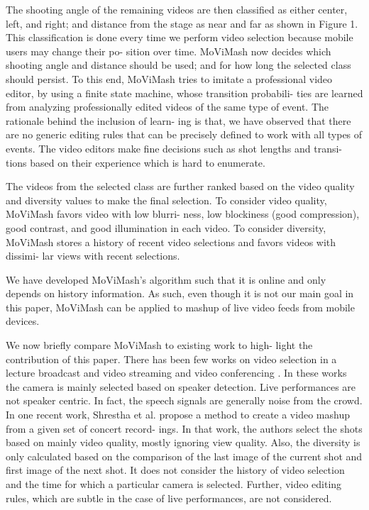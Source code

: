 \documentclass{new}
\begin{document}
The shooting angle of the remaining videos are then classified as
either center, left, and right; and distance from the stage as near and
far as shown in Figure 1. This classification is done every time we
perform video selection because mobile users may change their po-
sition over time. MoViMash now decides which shooting angle and
distance should be used; and for how long the selected class should
persist. To this end, MoViMash tries to imitate a professional video
editor, by using a finite state machine, whose transition probabili-
ties are learned from analyzing professionally edited videos of the
same type of event. The rationale behind the inclusion of learn-
ing is that, we have observed that there are no generic editing rules
that can be precisely defined to work with all types of events. The
video editors make fine decisions such as shot lengths and transi-
tions based on their experience which is hard to enumerate.

The videos from the selected class are further ranked based on
the video quality and diversity values to make the final selection.
To consider video quality, MoViMash favors video with low blurri-
ness, low blockiness (good compression), good contrast, and good
illumination in each video. To consider diversity, MoViMash stores
a history of recent video selections and favors videos with dissimi-
lar views with recent selections.

We have developed MoViMash’s algorithm such that it is online
and only depends on history information. As such, even though
it is not our main goal in this paper, MoViMash can be applied to
mashup of live video feeds from mobile devices.

We now briefly compare MoViMash to existing work to high-
light the contribution of this paper. There has been few works on
video selection in a lecture broadcast and video streaming \cite{21} \cite{6}
and video conferencing \cite{3}. In these works the camera is mainly
selected based on speaker detection. Live performances are not
speaker centric. In fact, the speech signals are generally noise from
the crowd. In one recent work, Shrestha et al. \cite{15} propose a
method to create a video mashup from a given set of concert record-
ings. In that work, the authors select the shots based on mainly
video quality, mostly ignoring view quality. Also, the diversity is
only calculated based on the comparison of the last image of the
current shot and first image of the next shot. It does not consider
the history of video selection and the time for which a particular
camera is selected. Further, video editing rules, which are subtle in
the case of live performances, are not considered.
\end{document}
